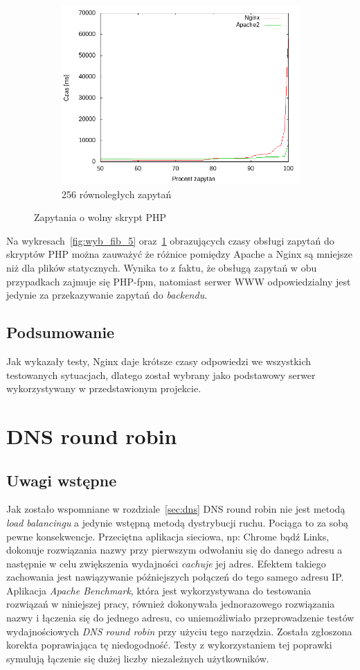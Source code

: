 \begin{figure}
\begin{subfigure}[h]{0.3\textwidth}
		\includegraphics[width=\textwidth]{testy/wybor_fib_15_256.png}
		\caption{256 równoległych zapytań}
	\end{subfigure}
	\caption{Zapytania o wolny skrypt PHP}\label{fig:wyb_fib_15}
\end{figure}
Na wykresach~\ref{fig:wyb_fib_5} oraz~\ref{fig:wyb_fib_15} obrazujących czasy obsługi zapytań do skryptów PHP można zauważyć że różnice pomiędzy Apache a Nginx są mniejsze niż dla plików statycznych.
Wynika to z faktu, że obsługą zapytań w obu przypadkach zajmuje się PHP-fpm, natomiast serwer WWW odpowiedzialny jest jedynie za przekazywanie zapytań do \textit{backendu}.
\subsection{Podsumowanie}
Jak wykazały testy, Nginx daje krótsze czasy odpowiedzi we wszystkich testowanych sytuacjach, dlatego został wybrany jako podstawowy serwer wykorzystywany w przedstawionym projekcie.
\clearpage
\section{DNS round robin}
\subsection{Uwagi wstępne}
Jak zostało wspomniane w rozdziale~\ref{sec:dns} DNS round robin nie jest metodą \textit{load balancingu} a jedynie wstępną metodą dystrybucji ruchu.
Pociąga to za sobą pewne konsekwencje.
Przeciętna aplikacja sieciowa, np: Chrome bądź Links, dokonuje rozwiązania nazwy przy pierwszym odwołaniu się do danego adresu a następnie w celu zwiększenia wydajności \textit{cachuje} jej adres.
Efektem takiego zachowania jest nawiązywanie późniejszych połączeń do tego samego adresu IP\@.
Aplikacja \textit{Apache Benchmark}, która jest wykorzystywana do testowania rozwiązań w niniejszej pracy, również dokonywała jednorazowego rozwiązania nazwy i łączenia się do jednego adresu, co uniemożliwiało przeprowadzenie testów wydajnościowych \textit{DNS round robin} przy użyciu tego narzędzia.
Została zgłoszona korekta \cite{ab_dnsrr} poprawiająca tę niedogodność.
Testy z wykorzystaniem tej poprawki symulują łączenie się dużej liczby niezależnych użytkowników.

